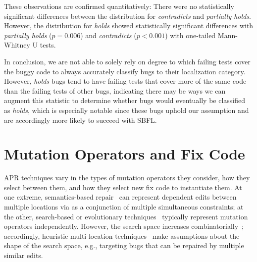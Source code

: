 \documentclass[10pt,journal,compsoc]{IEEEtran}
\begin{document}
These observations are confirmed quantitatively: There were no statistically significant 
differences between the distribution for \emph{contradicts} and \emph{partially holds}. 
However, the distribution for \emph{holds} showed statistically significant differences with 
\emph{partially holds} ($p = 0.006$)  and \emph{contradicts} ($p < 0.001$) with 
one-tailed Mann-Whitney U tests.

In conclusion, 
we are not able to solely rely on degree to which failing tests cover the buggy 
code to always accurately classify bugs to their localization category.
However, \emph{holds} bugs tend to have failing tests that cover more of the 
same code than the failing tests of other bugs, indicating 
there may be ways we can augment this statistic to determine whether bugs would eventually 
be classified as \emph{holds}, which is 
especially notable since these bugs uphold our assumption and are accordingly more likely to 
succeed with SBFL.
 
\section{Mutation Operators and Fix Code}
\label{sec:mutops}

APR techniques vary in the types of
mutation operators they consider, how they select between them, and how they
select new fix code to instantiate them. 
%
At one extreme, semantics-based repair~\cite{s3,angelix} can represent dependent edits between multiple
locations via as a conjunction of multiple simultaneous constraints; at the other, 
search-based or
evolutionary techniques~\cite{genprog,par} typically represent mutation
operators independently. 
However, the search space increases combinatorially~\cite{ae,long-search-spaces}; accordingly, 
heuristic multi-location
techniques~\cite{saha2019harnessing} make assumptions about the 
shape of the search space, e.g., targeting bugs that can be repaired by multiple similar edits.
\end{document}
